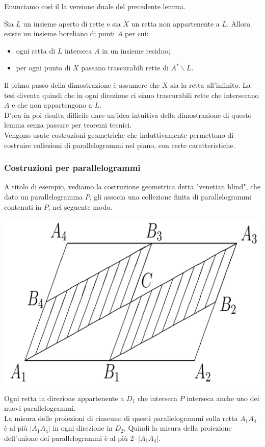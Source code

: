 \documentclass[11pt]{beamer} %
\newcommand{\<}{\langle}
\renewcommand{\>}{\rangle}
\theoremstyle{theorem}
\theoremstyle{theorem}
\theoremstyle{theorem}
\theoremstyle{theorem}
\theoremstyle{theorem}
\begin{document}
\begin{frame}
	Enunciamo così il la versione duale del precedente lemma.
	
	\begin{lemma}[2]
	Sia $L$ un insieme aperto di rette e sia $X$ un retta non appartenente a $L$. Allora esiste un insieme boreliano di punti $A$ per cui:\\
	\begin{itemize}
		\item ogni retta di $L$ interseca $A$ in un insieme residuo;\\
		\item per ogni punto di $X$ passano trascurabili rette di $A^{*} \backslash L$.\\
	\end{itemize}

	\medskip
	
	\end{lemma}
	\pause
	Il primo passo della dimostrazione è assumere che $X$ sia la retta all'infinito. La tesi diventa quindi che in ogni direzione ci siano trascurabili rette che intersecano $A$ e che non appartengono a $L$.\\
	\pause
	D'ora in poi risulta difficile dare un'idea intuitiva della dimostrazione di questo lemma senza passare per teoremi tecnici.\\
	\pause
	Vengono usate costruzioni geometriche che induttivamente permettono di costruire collezioni di parallelogrammi nel piano, con certe caratteristiche.\\
\end{frame}	



\begin{frame}[fragile]
	\frametitle{Costruzioni per parallelogrammi}
		A titolo di esempio, vediamo la costruzione geometrica detta "venetian blind", che dato un parallelogramma $P$, gli associa una collezione finita di parallelogrammi contenuti in $P$, nel seguente modo.
	\pause
	\begin{center}
		\includegraphics[width=0.4\columnwidth]{passo1.png}
	\end{center}
	\pause
	Ogni retta in direzione appartenente a $D_1$ che interseca $P$ interseca anche uno dei nuovi parallelogrammi.\\
	\pause
	La misura delle proiezioni di ciascuno di questi parallelogrammi sulla retta $A_{1} A_{4}$ è al più $\left|A_{1} A_{4}\right|$ in ogni direzione in $D_2$. \pause Quindi la misura della proiezione dell'unione dei parallelogrammi è al più $2 \cdot\left|A_{1} A_{4}\right|$.\\
\end{frame}
\end{document}
